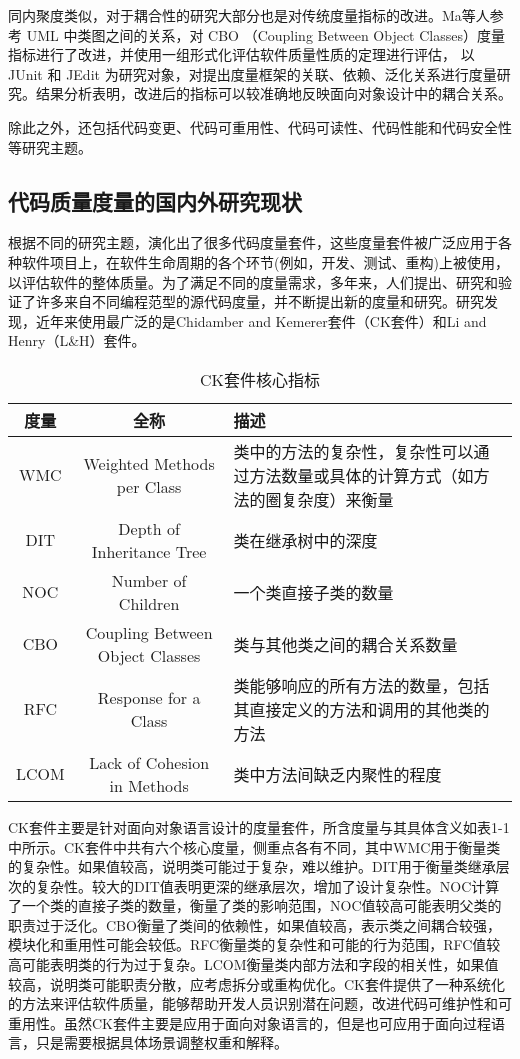 同内聚度类似，对于耦合性的研究大部分也是对传统度量指标的改进。Ma等人\cite{马健2018}参考 UML 中类图之间的关系，对 CBO （Coupling Between Object Classes）度量指标进行了改进，并使用一组形式化评估软件质量性质的定理进行评估， 以 JUnit 和 JEdit 为研究对象，对提出度量框架的关联、依赖、泛化关系进行度量研究。结果分析表明，改进后的指标可以较准确地反映面向对象设计中的耦合关系。

除此之外，还包括代码变更、代码可重用性、代码可读性、代码性能和代码安全性等研究主题。

\subsection{代码质量度量的国内外研究现状}

根据不同的研究主题，演化出了很多代码度量套件，这些度量套件被广泛应用于各种软件项目上，在软件生命周期的各个环节(例如，开发、测试、重构)上被使用，以评估软件的整体质量。为了满足不同的度量需求，多年来，人们提出、研究和验证了许多来自不同编程范型的源代码度量，并不断提出新的度量和研究。研究发现\cite{Ardito2020}，近年来使用最广泛的是Chidamber and Kemerer套件（CK套件）和Li and Henry（L&H）套件。


\begin{table}[htbp]
\caption{CK套件核心指标}
\vspace{0.5em}\centering\wuhao
\begin{tabular}{ccp{7.5cm}}
\toprule
度量 & 全称 & 描述 \\
\midrule
WMC & Weighted Methods per Class & 类中的方法的复杂性，复杂性可以通过方法数量或具体的计算方式（如方法的圈复杂度）来衡量 \\
DIT & Depth of Inheritance Tree & 类在继承树中的深度 \\
NOC & Number of Children & 一个类直接子类的数量 \\
CBO & Coupling Between Object Classes & 类与其他类之间的耦合关系数量  \\
RFC & Response for a Class & 类能够响应的所有方法的数量，包括其直接定义的方法和调用的其他类的方法  \\
LCOM & Lack of Cohesion in Methods & 类中方法间缺乏内聚性的程度  \\
\bottomrule
\end{tabular}
\end{table}

CK套件主要是针对面向对象语言设计的度量套件，所含度量与其具体含义如表1-1中所示。CK套件中共有六个核心度量，侧重点各有不同，其中WMC用于衡量类的复杂性。如果值较高，说明类可能过于复杂，难以维护。DIT用于衡量类继承层次的复杂性。较大的DIT值表明更深的继承层次，增加了设计复杂性。NOC计算了一个类的直接子类的数量，衡量了类的影响范围，NOC值较高可能表明父类的职责过于泛化。CBO衡量了类间的依赖性，如果值较高，表示类之间耦合较强，模块化和重用性可能会较低。RFC衡量类的复杂性和可能的行为范围，RFC值较高可能表明类的行为过于复杂。LCOM衡量类内部方法和字段的相关性，如果值较高，说明类可能职责分散，应考虑拆分或重构优化。CK套件提供了一种系统化的方法来评估软件质量，能够帮助开发人员识别潜在问题，改进代码可维护性和可重用性。虽然CK套件主要是应用于面向对象语言的，但是也可应用于面向过程语言，只是需要根据具体场景调整权重和解释。

